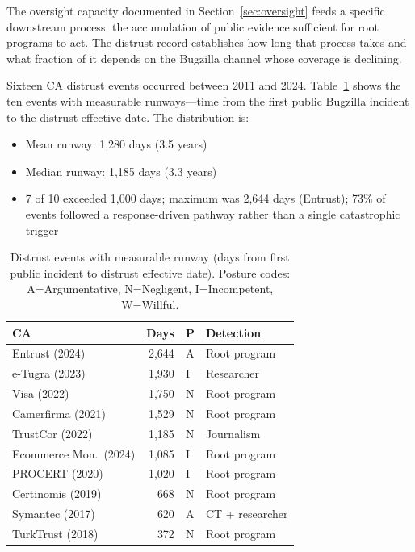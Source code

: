 \documentclass[10pt,twocolumn,letterpaper]{article}
\begin{document}
The oversight capacity documented in Section~\ref{sec:oversight} feeds a
specific downstream process: the accumulation of public evidence sufficient
for root programs to act. The distrust record establishes how long that
process takes and what fraction of it depends on the Bugzilla channel
whose coverage is declining.

Sixteen CA distrust events occurred between 2011 and 2024.
Table~\ref{tab:runway} shows the ten events with measurable runways---time
from the first public Bugzilla incident to the distrust effective date.
The distribution is:
\begin{itemize}[noitemsep, topsep=2pt]
\item Mean runway: 1,280 days (3.5 years)
\item Median runway: 1,185 days (3.3 years)
\item 7 of 10 exceeded 1,000 days; maximum was 2,644 days (Entrust); 73\% of events followed a response-driven pathway rather than a single catastrophic trigger
\end{itemize}

\begin{table}[t]
\centering
\footnotesize
\caption{Distrust events with measurable runway (days from first public
incident to distrust effective date). Posture codes: A=Argumentative,
N=Negligent, I=Incompetent, W=Willful.}
\label{tab:runway}
\begin{tabularx}{\columnwidth}{@{}Xrll@{}}
\toprule
CA & Days & P & Detection \\
\midrule
Entrust (2024)         & 2,644 & A & Root program \\
e-Tugra (2023)         & 1,930 & I & Researcher \\
Visa (2022)            & 1,750 & N & Root program \\
Camerfirma (2021)      & 1,529 & N & Root program \\
TrustCor (2022)        & 1,185 & N & Journalism \\
Ecommerce Mon.\ (2024) & 1,085 & I & Root program \\
PROCERT (2020)         & 1,020 & I & Root program \\
Certinomis (2019)      &   668 & N & Root program \\
Symantec (2017)        &   620 & A & CT + researcher \\
TurkTrust (2018)       &   372 & N & Root program \\
\bottomrule
\end{tabularx}
\end{table}
\end{document}
